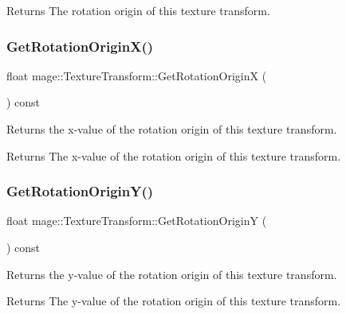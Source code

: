 \begin{DoxyReturn}{Returns}
The rotation origin of this texture transform. 
\end{DoxyReturn}
\hypertarget{structmage_1_1_texture_transform_a93637bf65911bdba80fc3b23a393fe5d}{}\label{structmage_1_1_texture_transform_a93637bf65911bdba80fc3b23a393fe5d} 
\subsubsection{\texorpdfstring{Get\+Rotation\+Origin\+X()}{GetRotationOriginX()}}
{\footnotesize\ttfamily float mage\+::\+Texture\+Transform\+::\+Get\+Rotation\+OriginX (\begin{DoxyParamCaption}{ }\end{DoxyParamCaption}) const\hspace{0.3cm}{\ttfamily [noexcept]}}

Returns the x-\/value of the rotation origin of this texture transform.

\begin{DoxyReturn}{Returns}
The x-\/value of the rotation origin of this texture transform. 
\end{DoxyReturn}
\hypertarget{structmage_1_1_texture_transform_aa4c3619818dce9c5b2a8ad489b7c74ae}{}\label{structmage_1_1_texture_transform_aa4c3619818dce9c5b2a8ad489b7c74ae} 
\subsubsection{\texorpdfstring{Get\+Rotation\+Origin\+Y()}{GetRotationOriginY()}}
{\footnotesize\ttfamily float mage\+::\+Texture\+Transform\+::\+Get\+Rotation\+OriginY (\begin{DoxyParamCaption}{ }\end{DoxyParamCaption}) const\hspace{0.3cm}{\ttfamily [noexcept]}}

Returns the y-\/value of the rotation origin of this texture transform.

\begin{DoxyReturn}{Returns}
The y-\/value of the rotation origin of this texture transform. 
\end{DoxyReturn}
\hypertarget{structmage_1_1_texture_transform_a4d6465ef615e8f1fd3b85541892313c8}{}\label{structmage_1_1_texture_transform_a4d6465ef615e8f1fd3b85541892313c8} 
